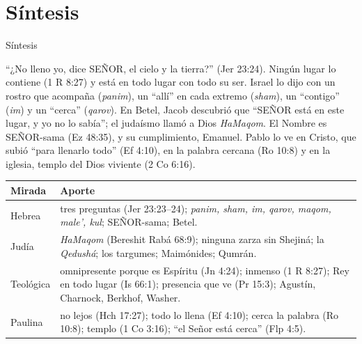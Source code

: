 \documentclass[hyperref={bookmarks=false},aspectratio=169]{beamer}
\newcommand{\SENOR}{S{\fontsize{0.78em}{1em}\selectfont EÑOR}}
\begin{document}
\section{Síntesis}

\begin{frame}{Síntesis}
\begin{tcolorbox}[colback=papiro,colframe=azul,boxrule=1pt,arc=3pt]
\scriptsize ``¿No lleno yo, dice \SENOR, el cielo y la tierra?'' (Jer 23:24). Ningún lugar lo contiene (1 R 8:27) y está en todo lugar con todo su ser. Israel lo dijo con un rostro que acompaña (\emph{panim}), un ``allí'' en cada extremo (\emph{sham}), un ``contigo'' (\emph{im}) y un ``cerca'' (\emph{qarov}). En Betel, Jacob descubrió que ``\SENOR{} está en este lugar, y yo no lo sabía''; el judaísmo llamó a Dios \emph{HaMaqom}. El Nombre es \SENOR-sama (Ez 48:35), y su cumplimiento, Emanuel. Pablo lo ve en Cristo, que subió ``para llenarlo todo'' (Ef 4:10), en la palabra cercana (Ro 10:8) y en la iglesia, templo del Dios viviente (2 Co 6:16).
\end{tcolorbox}
\scriptsize\renewcommand{\arraystretch}{1.12}
\begin{tabular}{@{}>{\RaggedRight\arraybackslash}p{2.0cm}>{\RaggedRight\arraybackslash}p{9.8cm}@{}}
\toprule
\textbf{Mirada} & \textbf{Aporte} \\ \midrule
Hebrea & tres preguntas (Jer 23:23--24); \emph{panim, sham, im, qarov, maqom, male', kul}; \SENOR-sama; Betel. \\
Judía & \emph{HaMaqom} (Bereshit Rabá 68:9); ninguna zarza sin Shejiná; la \emph{Qedushá}; los targumes; Maimónides; Qumrán. \\
Teológica & omnipresente porque es Espíritu (Jn 4:24); inmenso (1 R 8:27); Rey en todo lugar (Is 66:1); presencia que ve (Pr 15:3); Agustín, Charnock, Berkhof, Washer. \\
Paulina & no lejos (Hch 17:27); todo lo llena (Ef 4:10); cerca la palabra (Ro 10:8); templo (1 Co 3:16); ``el Señor está cerca'' (Flp 4:5). \\
\bottomrule
\end{tabular}
\end{frame}
\end{document}
